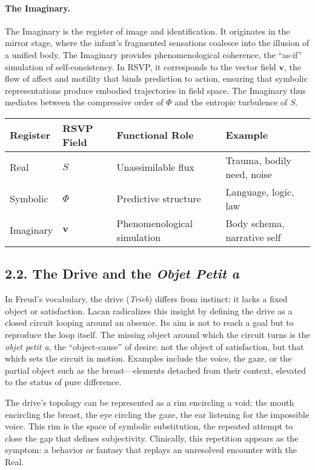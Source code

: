 \documentclass[12pt,a4paper]{article}
\begin{document}
\paragraph{The Imaginary.}
The Imaginary is the register of image and identification.  
It originates in the mirror stage, where the infant’s fragmented sensations coalesce into the illusion of a unified body.  
The Imaginary provides phenomenological coherence, the “as-if” simulation of self-consistency.  
In RSVP, it corresponds to the vector field \(\mathbf{v}\), the flow of affect and motility that binds prediction to action, ensuring that symbolic representations produce embodied trajectories in field space.  
The Imaginary thus mediates between the compressive order of \(\Phi\) and the entropic turbulence of \(S\).

\begin{center}
\renewcommand{\arraystretch}{1.3}
\begin{tabular}{@{}p{3cm}p{3cm}p{5cm}p{4cm}@{}}
\toprule
\textbf{Register} & \textbf{RSVP Field} & \textbf{Functional Role} & \textbf{Example} \\
\midrule
Real & $S$ & Unassimilable flux & Trauma, bodily need, noise \\
Symbolic & $\Phi$ & Predictive structure & Language, logic, law \\
Imaginary & $\mathbf{v}$ & Phenomenological simulation & Body schema, narrative self \\
\bottomrule
\end{tabular}
\end{center}

\subsection{2.2. The Drive and the \emph{Objet Petit a}}

In Freud’s vocabulary, the drive (\emph{Trieb}) differs from instinct: it lacks a fixed object or satisfaction.  
Lacan radicalizes this insight by defining the drive as a closed circuit looping around an absence.  
Its aim is not to reach a goal but to reproduce the loop itself.  
The missing object around which the circuit turns is the \emph{objet petit a}, the “object-cause” of desire: not the object of satisfaction, but that which sets the circuit in motion.  
Examples include the voice, the gaze, or the partial object such as the breast—elements detached from their context, elevated to the status of pure difference.

The drive’s topology can be represented as a rim encircling a void: the mouth encircling the breast, the eye circling the gaze, the ear listening for the impossible voice.  
This rim is the space of symbolic substitution, the repeated attempt to close the gap that defines subjectivity.  
Clinically, this repetition appears as the symptom: a behavior or fantasy that replays an unresolved encounter with the Real.
\end{document}
